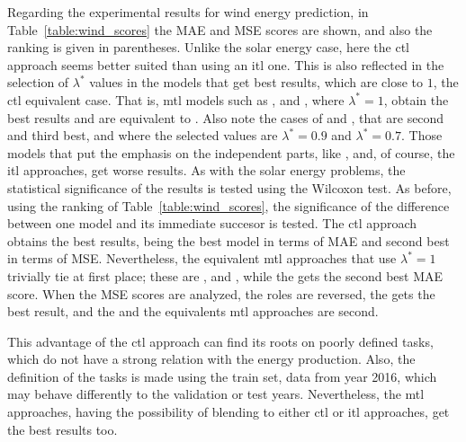 Regarding the experimental results for wind energy prediction, in Table~\ref{table:wind_scores} the MAE and MSE scores are shown, and also the ranking is given in parentheses. 
Unlike the solar energy case, here the \acrshort{ctl} approach seems better suited than using an \acrshort{itl} one. This is also reflected in the selection of $\lambda^*$ values in the models that get best results, which are close to $1$, the \acrshort{ctl} equivalent case. That is, \acrshort{mtl} models such as ,  and , where $\lambda^*=1$, obtain the best results and are equivalent to . Also note the cases of  and , that are second and third best, and where the selected values are $\lambda^*=0.9$ and $\lambda^*=0.7$.
Those models that put the emphasis on the independent parts, like , and, of course, the \acrshort{itl} approaches, get worse results.
%
%
As with the solar energy problems, the statistical significance of the results is tested using the Wilcoxon test. As before, using the ranking of Table~\ref{table:wind_scores}, the significance of the difference between one model and its immediate succesor is tested. 
%
%
The \acrshort{ctl} approach obtains the best results, being the best model in terms of MAE and second best in terms of MSE. Nevertheless, the equivalent \acrshort{mtl} approaches that use $\lambda^*=1$ trivially tie at first place; these are ,  and , while the  gets the second best MAE score.
When the MSE scores are analyzed, the roles are reversed, the  gets the best result, and the  and the equivalents \acrshort{mtl} approaches are second.

%
This advantage of the \acrshort{ctl} approach can find its roots on poorly defined tasks, which do not have a strong relation with the energy production. Also, the definition of the tasks is made using the train set, data from year 2016, which may behave differently to the validation or test years.
Nevertheless, the \acrshort{mtl} approaches, having the possibility of blending to either \acrshort{ctl} or \acrshort{itl} approaches, get the best results too.

